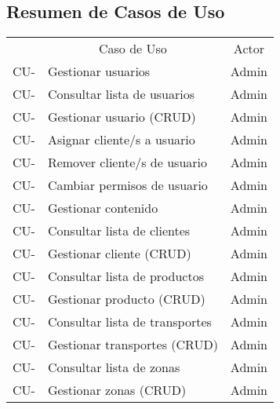     \subsection{Resumen de Casos de Uso}
    \newcommand\rownumber{\stepcounter{magicrownumbers}\arabic{magicrownumbers}}
    \begin{center}
        \begin{longtable}{ | l | l | c | }
            \hline
            \rowcolor{gray!30}
            \multicolumn{1}{|c|}{ID del Caso de Uso} &
            \multicolumn{1}{|c|}{Caso de Uso} &
            \multicolumn{1}{|c|}{Actor} \\
            \hhline{===}
            \endhead

            \endfoot

            CU-\rownumber & Gestionar usuarios & Admin \\ \hline
            CU-\rownumber & Consultar lista de usuarios & Admin \\ \hline
            CU-\rownumber & Gestionar usuario (CRUD) & Admin \\ \hline
            CU-\rownumber & Asignar cliente/s a usuario & Admin \\ \hline
            CU-\rownumber & Remover cliente/s de usuario & Admin \\ \hline
            CU-\rownumber & Cambiar permisos de usuario & Admin \\ \hline

            CU-\rownumber & Gestionar contenido & Admin \\ \hline
            CU-\rownumber & Consultar lista de clientes & Admin \\ \hline
            CU-\rownumber & Gestionar cliente (CRUD) & Admin \\ \hline
            CU-\rownumber & Consultar lista de productos & Admin \\ \hline
            CU-\rownumber & Gestionar producto (CRUD) & Admin \\ \hline
            CU-\rownumber & Consultar lista de transportes & Admin \\ \hline
            CU-\rownumber & Gestionar transportes (CRUD) & Admin \\ \hline
            CU-\rownumber & Consultar lista de zonas & Admin \\ \hline
            CU-\rownumber & Gestionar zonas (CRUD) & Admin \\ \hline


\end{longtable}
\end{center}
